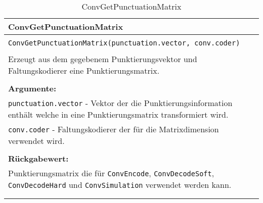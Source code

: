 \begin{longtable}{|p{\textwidth}|}
\hline
\rowcolor{lightblue}
ConvGetPunctuationMatrix
\\
\hline
\\
\texttt{ConvGetPunctuationMatrix(punctuation.vector, conv.coder)}\\
\\
Erzeugt aus dem gegebenem Punktierungsvektor und Faltungskodierer eine Punktierungsmatrix.\\
\\
\textbf{Argumente:}\\
\texttt{punctuation.vector} - Vektor der die Punktierungsinformation enthält welche in eine Punktierungsmatrix transformiert wird.\\
\texttt{conv.coder} - Faltungskodierer der für die Matrixdimension verwendet wird.\\
\\
\textbf{Rückgabewert:}\\
Punktierungsmatrix die für \texttt{ConvEncode}, \texttt{ConvDecodeSoft}, \texttt{ConvDecodeHard} und \texttt{ConvSimulation} verwendet werden kann.\\
\\
\hline
\caption{ConvGetPunctuationMatrix}
\end{longtable}
